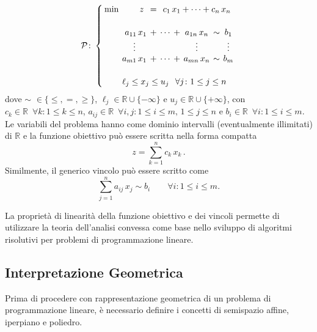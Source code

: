 \begin{equation}
\mathcal{P}\colon
\setlength{\arraycolsep}{2pt}
\left\{\begin{array}{rrcccccc}
\min & z\,\, &=& \multicolumn{5}{c}{c_{1}\,x_{1}+\cdots+c_{n}\,x_{n}} \\[15pt]
     &  a_{11}\,x_{1} &+ &\cdots &+ &a_{1n}\,x_{n} &\sim &b_{1}       \\
     & \multicolumn{1}{c}{\vdots} &&&&\vdots&& \vdots                 \\
     &  a_{m1}\,x_{1} &+ &\cdots &+ &a_{mn}\,x_{n} &\sim &b_{m}       \\[15pt]
     & \multicolumn{7}{l}{\ell_j \le x_{j} \le u_{j} \;\;\, \forall j\colon
     1 \le j \le n}
\end{array}\right.\\[10pt]
\end{equation}
dove $\sim\,\,\in \{ \le, =, \ge \}$, $\ell_j \in \mathbb{R} \cup
\{-\infty\}$ e $u_{j} \in \mathbb{R} \cup \{+\infty\}$, con $c_{k} \in
\mathbb{R} \,\,\, \forall k\colon 1 \le k \le n$, $a_{ij} \in \mathbb{R}
\,\,\, \forall i,j\colon 1 \le i \le m,\, 1 \le j \le n$ e $b_{i} \in
\mathbb{R} \,\,\, \forall i\colon 1 \le i \le m$. Le variabili del
problema hanno come dominio intervalli (eventualmente illimitati) di
$\mathbb{R}$ e la funzione obiettivo può essere scritta nella forma compatta
\begin{equation}
    z = \sum_{k=1}^{n} c_{k}\,x_{k}\,.
\end{equation}
Similmente, il generico vincolo può essere scritto come
\begin{equation}
    \sum_{j=1}^{n}a_{ij}\,x_{j} \sim b_{i} \qquad \forall i\colon 1 \le i \le m
.\end{equation}

La proprietà di linearità della funzione obiettivo e dei vincoli permette
di utilizzare la teoria dell'analisi convessa come base nello sviluppo di
algoritmi risolutivi per problemi di programmazione lineare.

\subsection{Interpretazione Geometrica}
Prima di procedere con rappresentazione geometrica di un problema di
programmazione lineare, è necessario definire i concetti di semispazio
affine, iperpiano e poliedro.

